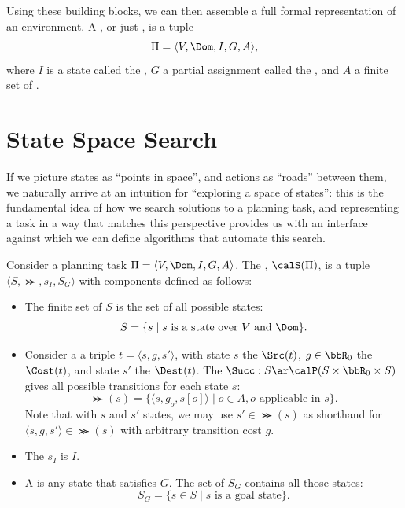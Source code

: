 Using these building blocks, we can then assemble a full formal representation of an environment. A , or just , is a tuple $$\Pi=\langle V,\Dom,I,G,A\rangle,$$ where $I$ is a state called the , $G$ a partial assignment called the , and $A$ a finite set of .


\section{State Space Search}

If we picture states as ``points in space'', and actions as ``roads'' between them, we naturally arrive at an intuition for ``exploring a space of states'': this is the fundamental idea of how we search solutions to a planning task, and representing a task in a way that matches this perspective provides us with an interface against which we can define algorithms that automate this search.

Consider a planning task $\Pi=\langle V,\Dom,I,G,A\rangle$. The , $\calS(\Pi)$, is a tuple $\langle S,\Succ,s_I,S_G\rangle$ with components defined as follows:

\begin{itemize}
    \item The finite set of  $S$ is the set of all possible states: $$S=\{s\mid s\text{ is a state over }V\text{ and }\Dom\}.$$
    \item Consider a  a triple $t=\langle s,g,s'\rangle$, with state $s$ the  $\Src(t)$, $g\in\bbR_0$ the  $\Cost(t)$, and state $s'$ the  $\Dest(t)$. The  $\Succ:S\ar\calP(S\times\bbR_0\times S)$ gives all possible transitions for each state $s$: $$\Succ(s)=\{\langle s,g_o,s[o]\rangle\mid o\in A, o\text{ applicable in }s\}.$$ Note that with $s$ and $s'$ states, we may use $s'\in\Succ(s)$ as shorthand for $\langle s,g,s'\rangle\in\Succ(s)$ with arbitrary transition cost $g$.
    \item The  $s_I$ is $I$.
    \item A  is any state that satisfies $G$. The set of  $S_G$ contains all those states: $$S_G=\{s\in S\mid s\text{ is a goal state}\}.$$
\end{itemize}

